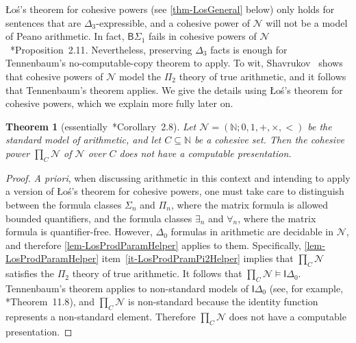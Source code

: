 \documentclass[11pt,a4paper,reqno]{amsart}
\newtheorem{Theorem}{Theorem}[section]
\theoremstyle{definition}
\newcommand{\Nb}{\mathbb{N}}
\newcommand{\mc}[1]{\mathcal{#1}}
\begin{document}
{\L}o\'{s}'s theorem for cohesive powers (see \cref{thm-LosGeneral} below) only holds for sentences that are $\Delta_3$-expressible, and a cohesive power of $\mc{N}$ will not be a model of Peano arithmetic.  In fact, $\mathsf{B}\Sigma_1$ fails in cohesive powers of $\mc{N}$~\cite{ShavrukovPrimePowers}*{Proposition~2.11}.  Nevertheless, preserving $\Delta_3$ facts is enough for Tennenbaum's no-computable-copy theorem to apply.  To wit, Shavrukov~\cite{ShavrukovPrimePowers} shows that cohesive powers of $\mc{N}$ model the $\Pi_2$ theory of true arithmetic, and it follows that Tennenbaum's theorem applies.  We give the details using {\L}o\'{s}'s theorem for cohesive powers, which we explain more fully later on.

\begin{Theorem}[essentially~\cite{ShavrukovPrimePowers}*{Corollary~2.8}]
Let $\mc{N} = (\Nb; 0, 1, +, \times, <)$ be the standard model of arithmetic, and let $C \subseteq \Nb$ be a cohesive set.  Then the cohesive power $\prod_C \mc{N}$ of $\mc{N}$ over $C$ does not have a computable presentation.
\end{Theorem}

\begin{proof}
\emph{A priori}, when discussing arithmetic in this context and intending to apply a version of {\L}o\'{s}'s theorem for cohesive powers, one must take care to distinguish between the formula classes $\Sigma_n$ and $\Pi_n$, where the matrix formula is allowed bounded quantifiers, and the formula classes $\exists_n$ and $\forall_n$, where the matrix formula is quantifier-free.  However, $\Delta_0$ formulas in arithmetic are decidable in $\mc{N}$, and therefore \cref{lem-LosProdParamHelper} applies to them.  Specifically, \cref{lem-LosProdParamHelper} item~\ref{it-LosProdPramPi2Helper} implies that $\prod_C \mc{N}$ satisfies the $\Pi_2$ theory of true arithmetic.  It follows that $\prod_C \mc{N} \models \mathsf{I}\Delta_0$.  Tennenbaum's theorem applies to non-standard models of $\mathsf{I}\Delta_0$ (see, for example, \cite{KayeBook}*{Theorem~11.8}), and $\prod_C \mc{N}$ is non-standard because the identity function represents a non-standard element.  Therefore $\prod_C \mc{N}$ does not have a computable presentation.
\end{proof}
\end{document}

